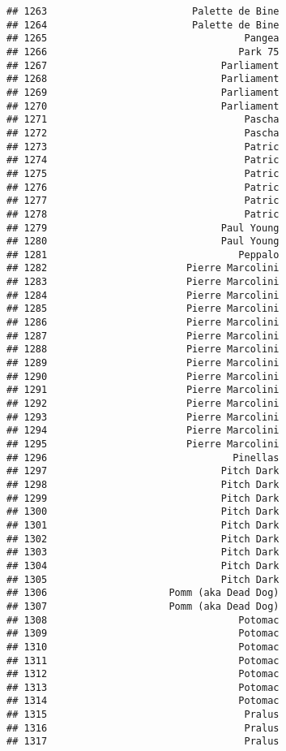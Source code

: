 \documentclass[
]{article}
\begin{document}
\begin{verbatim}
## 1263                         Palette de Bine
## 1264                         Palette de Bine
## 1265                                  Pangea
## 1266                                 Park 75
## 1267                              Parliament
## 1268                              Parliament
## 1269                              Parliament
## 1270                              Parliament
## 1271                                  Pascha
## 1272                                  Pascha
## 1273                                  Patric
## 1274                                  Patric
## 1275                                  Patric
## 1276                                  Patric
## 1277                                  Patric
## 1278                                  Patric
## 1279                              Paul Young
## 1280                              Paul Young
## 1281                                 Peppalo
## 1282                        Pierre Marcolini
## 1283                        Pierre Marcolini
## 1284                        Pierre Marcolini
## 1285                        Pierre Marcolini
## 1286                        Pierre Marcolini
## 1287                        Pierre Marcolini
## 1288                        Pierre Marcolini
## 1289                        Pierre Marcolini
## 1290                        Pierre Marcolini
## 1291                        Pierre Marcolini
## 1292                        Pierre Marcolini
## 1293                        Pierre Marcolini
## 1294                        Pierre Marcolini
## 1295                        Pierre Marcolini
## 1296                                Pinellas
## 1297                              Pitch Dark
## 1298                              Pitch Dark
## 1299                              Pitch Dark
## 1300                              Pitch Dark
## 1301                              Pitch Dark
## 1302                              Pitch Dark
## 1303                              Pitch Dark
## 1304                              Pitch Dark
## 1305                              Pitch Dark
## 1306                     Pomm (aka Dead Dog)
## 1307                     Pomm (aka Dead Dog)
## 1308                                 Potomac
## 1309                                 Potomac
## 1310                                 Potomac
## 1311                                 Potomac
## 1312                                 Potomac
## 1313                                 Potomac
## 1314                                 Potomac
## 1315                                  Pralus
## 1316                                  Pralus
## 1317                                  Pralus

\end{verbatim}
\end{document}
